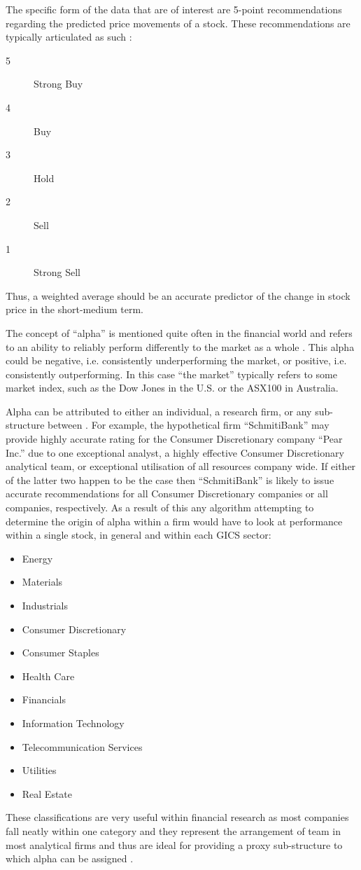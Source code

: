 The specific form of the data that are of interest are 5-point recommendations regarding the predicted price movements of a stock. These recommendations are typically articulated as such \cite{ibesMan}:
\begin{description}
    \item[5] Strong Buy
    \item[4] Buy
    \item[3] Hold
    \item[2] Sell
    \item[1] Strong Sell
\end{description}
Thus, a weighted average should be an accurate predictor of the change in stock price in the short-medium term.

The concept of ``alpha'' is mentioned quite often in the financial world and refers to an ability to reliably perform differently to the market as a whole \cite{blanchett2013alpha, holmes2009seeking}. This alpha could be negative, i.e. consistently underperforming the market, or positive, i.e. consistently outperforming. In this case ``the market'' typically refers to some market index, such as the Dow Jones in the U.S. or the ASX100 in Australia.

Alpha can be attributed to either an individual, a research firm, or any sub-structure between \cite{hung2009defining}. For example, the hypothetical firm ``SchmitiBank'' may provide highly accurate rating for the Consumer Discretionary company ``Pear Inc.'' due to one exceptional analyst, a highly effective Consumer Discretionary analytical team, or exceptional utilisation of all resources company wide. If either of the latter two happen to be the case then ``SchmitiBank'' is likely to issue accurate recommendations for all Consumer Discretionary companies or all companies, respectively. As a result of this any algorithm attempting to determine the origin of alpha within a firm would have to look at performance within a single stock, in general and within each GICS sector:
\begin{itemize}
    \item Energy
    \item Materials
    \item Industrials
    \item Consumer Discretionary
    \item Consumer Staples
    \item Health Care
    \item Financials
    \item Information Technology
    \item Telecommunication Services
    \item Utilities
    \item Real Estate
\end{itemize}
These classifications are very useful within financial research as most companies fall neatly within one category and they represent the arrangement of team in most analytical firms and thus are ideal for providing a proxy sub-structure to which alpha can be assigned \cite{robert2003strategic}. 